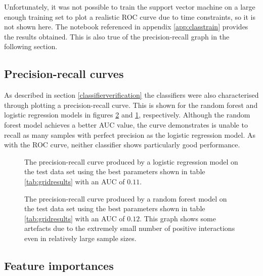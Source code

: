 Unfortunately, it was not possible to train the support vector machine on a large enough training set to plot a realistic ROC curve due to time constraints, so it is not shown here.
The notebook referenced in appendix \ref{app:classtrain} provides the results obtained.
This is also true of the precision-recall graph in the following section.


\subsection{Precision-recall curves}

As described in section \ref{classifierverification} the classifiers were also characterised through plotting a precision-recall curve.
This is shown for the random forest and logistic regression models in figures \ref{fig:rfpr} and \ref{fig:logpr}, respectively.
Although the random forest model achieves a better AUC value, the curve demonstrates is unable to recall as many samples with perfect precision as the logistic regression model.
As with the ROC curve, neither classifier shows particularly good performance.

\begin{figure}
    \centering
    \setlength\figureheight{2in}
    \setlength\figurewidth{3in}
    \caption{The precision-recall curve produced by a logistic regression model on the test data set using the best parameters shown in table \ref{tab:gridresults} with an AUC of $0.11$.}
    \label{fig:logpr}
\end{figure}

\begin{figure}
    \centering
    \setlength\figureheight{2in}
    \setlength\figurewidth{3in}
    \caption{The precision-recall curve produced by a random forest model on the test data set using the best parameters shown in table \ref{tab:gridresults} with an AUC of $0.12$. This graph shows some artefacts due to the extremely small number of positive interactions even in relatively large sample sizes.}
    \label{fig:rfpr}
\end{figure}

\subsection{Feature importances}
\label{importances}

